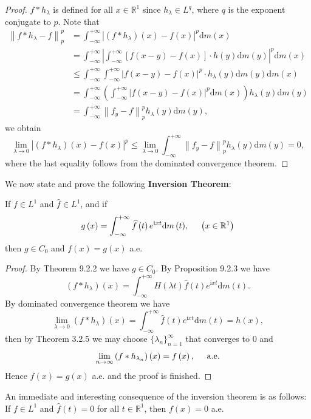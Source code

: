 \begin{proof}
$f*h_\lambda$ is defined for all $x\in\mathbb{R}^1$ since $h_\lambda\in L^q$, where $q$ is the exponent conjugate to $p$. Note that 
$$
\begin{aligned}
\left\| f*h_{\lambda}-f \right\| _{p}^{p}&=\int_{-\infty}^{+\infty}{\left| \left( f*h_{\lambda} \right) \left( x \right) -f\left( x \right) \right|^p\mathrm{d}m\left( x \right)}
\\
&=\int_{-\infty}^{+\infty}{\left| \int_{-\infty}^{+\infty}{\left[ f\left( x-y \right) -f\left( x \right) \right] \cdot h\left( y \right) \mathrm{d}m\left( y \right)} \right|^p\mathrm{d}m\left( x \right)}
\\
&\le \int_{-\infty}^{+\infty}{\int_{-\infty}^{+\infty}{\left| f\left( x-y \right) -f\left( x \right) \right|^p\cdot h_{\lambda}\left( y \right) \mathrm{d}m\left( y \right)}\mathrm{d}m\left( x \right)}
\\
&=\int_{-\infty}^{+\infty}{\left( \int_{-\infty}^{+\infty}{\left| f\left( x-y \right) -f\left( x \right) \right|^p\mathrm{d}m\left( x \right)} \right) h_{\lambda}\left( y \right) \mathrm{d}m\left( y \right)}
\\
&=\int_{-\infty}^{+\infty}{\left\| f_y-f \right\| _{p}^{p}h_{\lambda}\left( y \right) \mathrm{d}m\left( y \right)},
\end{aligned}
$$
we obtain 
$$
\lim_{\lambda \rightarrow 0} \left| \left( f*h_{\lambda} \right) \left( x \right) -f\left( x \right) \right|^p\le \lim_{\lambda \rightarrow 0} \int_{-\infty}^{+\infty}{\left\| f_y-f \right\| _{p}^{p}h_{\lambda}\left( y \right) \mathrm{d}m\left( y \right)}=0,
$$
where the last equality follows from the dominated convergence theorem.
\end{proof}
We now state and prove the following \textbf{Inversion Theorem}:
\begin{theorem}
If $f\in L^1$ and $\widehat{f}\in L^1$, and if 
$$
g\left( x \right) =\int_{-\infty}^{+\infty}{\widehat{f}\left( t \right) e^{\mathrm{i}xt}\mathrm{d}m\left( t \right)},\hspace{0.5cm}\left( x\in \mathbb{R} ^1 \right) 
$$
then $g\in C_0$ and $f(x)=g(x)$ a.e.
\end{theorem}
\begin{proof}
By Theorem 9.2.2 we have $g\in C_0$. By Proposition 9.2.3 we have 
$$
\left( f*h_{\lambda} \right) \left( x \right) =\int_{-\infty}^{+\infty}{H\left( \lambda t \right) \widehat{f}\left( t \right) e^{\mathrm{i}xt}\mathrm{d}m\left( t \right)}.
$$
By dominated convergence theorem we have 
$$
\lim_{\lambda \rightarrow 0} \left( f*h_{\lambda} \right) \left( x \right) =\int_{-\infty}^{+\infty}{\widehat{f}\left( t \right) e^{\mathrm{i}xt}\mathrm{d}m\left( t \right)}=h\left( x \right) ,
$$
then by Theorem 3.2.5 we may choose $\{\lambda_n\}_{n=1}^\infty$ that converges to $0$ and 
$$
\lim_{n\rightarrow \infty} \left( f*h_{\lambda _n} \right) \left( x \right) =f\left( x \right) ,\hspace{0.5cm}\mathrm{a}.\mathrm{e}.
$$
Hence $f(x)=g(x)$ a.e. and the proof is finished.
\end{proof}
An immediate and interesting consequence of the inversion theorem is as follows: If $f\in L^1$ and $\widehat{f}(t)=0$ for all $t\in\mathbb{R}^1$, then $f(x)=0$ a.e.
